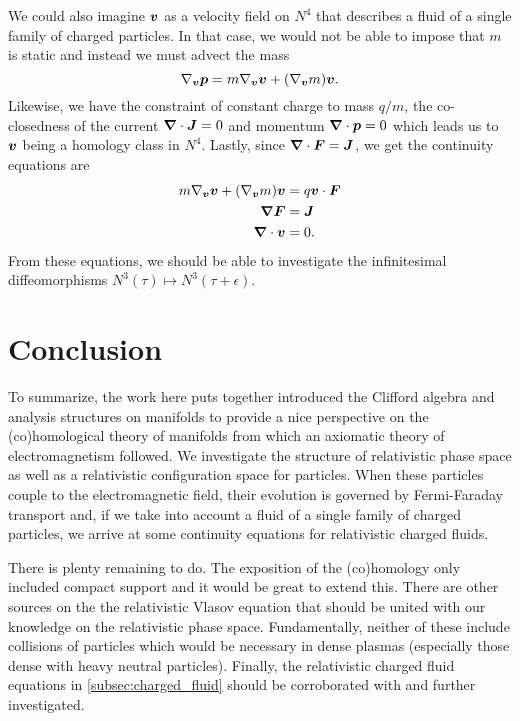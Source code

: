 \documentclass{article}
\begin{document}
We could also imagine ${\boldsymbol{v}}$ as a velocity field on $N^4$ that describes a fluid of a single family of charged particles. In that case, we would not be able to impose that $m$ is static and instead we must advect the mass
\begin{equation}
   \nabla_{\boldsymbol{v}} \boldsymbol{p} = m \nabla_{\boldsymbol{v}} \boldsymbol{v} + (\nabla_{\boldsymbol{v}} m)\boldsymbol{v}.
\end{equation}
Likewise, we have the constraint of constant charge to mass $q/m$, the co-closedness of the current $\boldsymbol{\nabla} \cdot \boldsymbol{J}=0$ and momentum $\boldsymbol{\nabla} \cdot \boldsymbol{p}=0$ which leads us to $\boldsymbol{v}$ being a homology class in $N^4$. Lastly, since $\boldsymbol{\nabla} \cdot \boldsymbol{F} = \boldsymbol{J}$, we get the continuity equations are
\begin{align}
    m \nabla_{\boldsymbol{v}} \boldsymbol{v} + (\nabla_{\boldsymbol{v}} m)\boldsymbol{v} &= q \boldsymbol{v} \cdot \boldsymbol{F}\\
    \boldsymbol{\nabla} \boldsymbol{F} &= \boldsymbol{J}\\
    \boldsymbol{\nabla} \cdot \boldsymbol{v} &= 0.
\end{align}
From these equations, we should be able to investigate the infinitesimal diffeomorphisms $N^3(\tau)\mapsto N^3(\tau+\epsilon)$.

\section{Conclusion}

To summarize, the work here puts together introduced the Clifford algebra and analysis structures on manifolds to provide a nice perspective on the (co)homological theory of manifolds from which an axiomatic theory of electromagnetism followed. We investigate the structure of relativistic phase space as well as a relativistic configuration space for particles. When these particles couple to the electromagnetic field, their evolution is governed by Fermi-Faraday transport and, if we take into account a fluid of a single family of charged particles, we arrive at some continuity equations for relativistic charged fluids.

There is plenty remaining to do. The exposition of the (co)homology only included compact support and it would be great to extend this. There are other sources on the the relativistic Vlasov equation \cite{brizard_new_2000,marsden_hamiltonian_1982} that should be united with our knowledge on the relativistic phase space. Fundamentally, neither of these include collisions of particles which would be necessary in dense plasmas (especially those dense with heavy neutral particles). Finally, the relativistic charged fluid equations in \cref{subsec:charged_fluid} should be corroborated with \cite{pausader_relativistic_2013} and further investigated.
\end{document}
